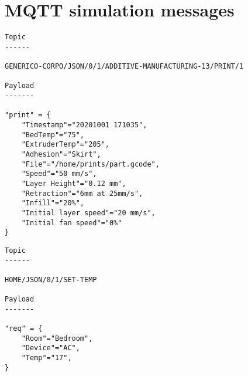 \chapter{MQTT simulation messages}\label{appendix:mqtt_message}

\begin{lstlisting}[caption = {The message payload and topic used to transmit for the printer farm scenario.}, label={lst:msg_farm}]
Topic
------

GENERICO-CORPO/JSON/0/1/ADDITIVE-MANUFACTURING-13/PRINT/1

Payload
-------

"print" = {
    "Timestamp"="20201001 171035",
    "BedTemp"="75",
    "ExtruderTemp"="205",
    "Adhesion"="Skirt",
    "File"="/home/prints/part.gcode",
    "Speed"="50 mm/s",
    "Layer Height"="0.12 mm",
    "Retraction"="6mm at 25mm/s",
    "Infill"="20%",
    "Initial layer speed"="20 mm/s",
    "Initial fan speed"="0%"
}
\end{lstlisting}

\begin{lstlisting}[caption = {The message payload and topic used to transmit for the printer home scenario.}, label={lst:msg_home}]
Topic
------

HOME/JSON/0/1/SET-TEMP

Payload
-------

"req" = {
    "Room"="Bedroom",
    "Device"="AC",
    "Temp"="17",
}
\end{lstlisting}